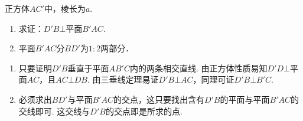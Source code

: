\noindent
\begin{minipage}{.55\textwidth}
    \begin{example}
        正方体$AC'$中，棱长为$a$.
    \begin{enumerate}[(1)]
    \item 求证：$D'B\bot $平面$B'AC$.
    \item 平面$B'AC$分$BD'$为$1:2$两部分．
    \end{enumerate}
    
    \end{example}
\end{minipage}
\hfill
\begin{minipage}{.4\textwidth}
\centering
{}
\end{minipage}


\begin{analyze}
\begin{enumerate}[(1)]
    \item 只要证明$D'B$垂直于平面$AB'C$内的两条相交直线. 由正方体性质易知$D'D\bot $平面$AC$，且$AC\bot DB$. 由三垂线定理易证$D'B\bot AC$，同理可证$D'B\bot B'C$.
    \item 必须求出$BD'$与平面$B'AC$的交点，这只要找出含有$D'B$的平面与平面$B'AC$的交线即可. 这交线与$D'B$的交点即是所求的点.
\end{enumerate} 
\end{analyze}

